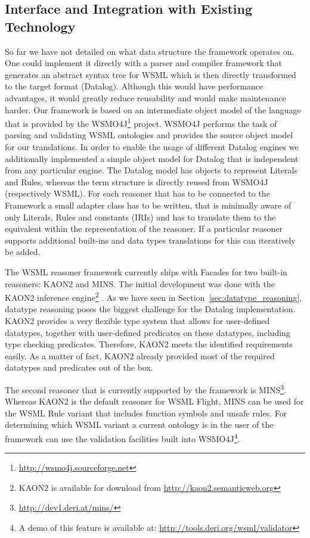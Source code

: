 \subsection{Interface and Integration with Existing Technology}
So far we have not detailed on what data structure the framework
operates on. One could implement it directly with a parser and
compiler framework that generates an abstract syntax tree for WSML
which is then directly transformed to the target format (Datalog).
Although this would have performance advantages, it would greatly
reduce reusability and would make maintenance harder. Our framework
is based on an intermediate object model of the language that is
provided by the WSMO4J\footnote{\url{http://wsmo4j.sourceforge.net}}
project. WSMO4J performs the task of parsing and validating WSML
ontologies and provides the source object model for our
translations. In order to enable the usage of different Datalog
engines we additionally implemented a simple object model for
Datalog that is independent from any particular engine. The Datalog
model has objects to represent Literals and Rules, whereas the term
structure is directly reused from WSMO4J (respectively WSML). For
each reasoner that has to be connected to the Framework a small
adapter class has to be written, that is minimally aware of only
Literals, Rules and constants (IRIs) and has to translate them to
the equivalent within the representation of the reasoner. If a
particular reasoner supports additional built-ins and data types
translations for this can iteratively be added.

The WSML reasoner framework currently ships with Facades for two
built-in reasoners: KAON2 and MINS. The initial development was done
with the KAON2 inference engine\footnote{KAON2 is available for
download from \url{http://kaon2.semanticweb.org}}
\cite{hustadt04reducing}. As we have seen in
Section~\ref{sec:datatype_reasoning}, datatype reasoning poses the
biggest challenge for the Datalog implementation. KAON2 provides a
very flexible type system that allows for user-defined datatypes,
together with user-defined predicates on these datatypes, including
type checking predicates. Therefore, KAON2 meets the identified
requirements easily. As a matter of fact, KAON2 already provided
most of the required datatypes and predicates out of the box.

The second reasoner that is currently supported by the framework is
MINS\footnote{\url{http://dev1.deri.at/mins/}}. Whereas KAON2 is the
default reasoner for WSML Flight, MINS can be used for the WSML Rule
variant that includes function symbols and unsafe rules. For
determining which WSML variant a current ontology is in the user of
the framework can use the validation facilities built into
WSMO4J\footnote{A demo of this feature is available at:
\url{http://tools.deri.org/wsml/validator}}.
